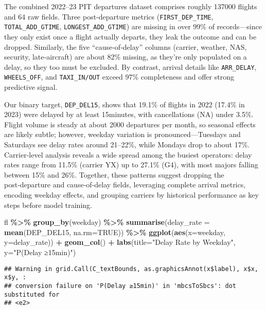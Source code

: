 \documentclass[
]{article}
\newenvironment{Shaded}{\begin{snugshade}}{\end{snugshade}}
\newcommand{\AttributeTok}[1]{\textcolor[rgb]{0.13,0.29,0.53}{#1}}
\newcommand{\ConstantTok}[1]{\textcolor[rgb]{0.56,0.35,0.01}{#1}}
\newcommand{\FunctionTok}[1]{\textcolor[rgb]{0.13,0.29,0.53}{\textbf{#1}}}
\newcommand{\NormalTok}[1]{#1}
\newcommand{\SpecialCharTok}[1]{\textcolor[rgb]{0.81,0.36,0.00}{\textbf{#1}}}
\newcommand{\StringTok}[1]{\textcolor[rgb]{0.31,0.60,0.02}{#1}}
\begin{document}
The combined 2022--23 PIT departures dataset comprises roughly 137000
flights and 64 raw fields. Three post‑departure metrics
(\texttt{FIRST\_DEP\_TIME}, \texttt{TOTAL\_ADD\_GTIME},
\texttt{LONGEST\_ADD\_GTIME}) are missing in over 99\% of
records---since they only exist once a flight actually departs, they
leak the outcome and can be dropped. Similarly, the five
``cause‑of‑delay'' columns (carrier, weather, NAS, security,
late‑aircraft) are about 82\% missing, as they're only populated on a
delay, so they too must be excluded. By contrast, arrival details like
\texttt{ARR\_DELAY}, \texttt{WHEELS\_OFF}, and \texttt{TAXI\_IN/OUT}
exceed 97\% completeness and offer strong predictive signal.

Our binary target, \texttt{DEP\_DEL15}, shows that 19.1\% of flights in
2022 (17.4\% in 2023) were delayed by at least 15minutes, with
cancellations (NA) under 3.5\%. Flight volume is steady at about 2000
departures per month, so seasonal effects are likely subtle; however,
weekday variation is pronounced---Tuesdays and Saturdays see delay rates
around 21--22\%, while Mondays drop to about 17\%. Carrier‑level
analysis reveals a wide spread among the busiest operators: delay rates
range from 11.5\% (carrier YX) up to 27.1\% (G4), with most majors
falling between 15\% and 26\%. Together, these patterns suggest dropping
the post‑departure and cause‑of‑delay fields, leveraging complete
arrival metrics, encoding weekday effects, and grouping carriers by
historical performance as key steps before model training.

\begin{Shaded}
\begin{Highlighting}[]
\NormalTok{fl }\SpecialCharTok{\%\textgreater{}\%}
  \FunctionTok{group\_by}\NormalTok{(weekday) }\SpecialCharTok{\%\textgreater{}\%}
  \FunctionTok{summarise}\NormalTok{(}\AttributeTok{delay\_rate =} \FunctionTok{mean}\NormalTok{(DEP\_DEL15, }\AttributeTok{na.rm=}\ConstantTok{TRUE}\NormalTok{)) }\SpecialCharTok{\%\textgreater{}\%}
  \FunctionTok{ggplot}\NormalTok{(}\FunctionTok{aes}\NormalTok{(}\AttributeTok{x=}\NormalTok{weekday, }\AttributeTok{y=}\NormalTok{delay\_rate)) }\SpecialCharTok{+}
    \FunctionTok{geom\_col}\NormalTok{() }\SpecialCharTok{+}
    \FunctionTok{labs}\NormalTok{(}\AttributeTok{title=}\StringTok{"Delay Rate by Weekday"}\NormalTok{, }\AttributeTok{y=}\StringTok{"P(Delay ≥15min)"}\NormalTok{)}
\end{Highlighting}
\end{Shaded}

\begin{verbatim}
## Warning in grid.Call(C_textBounds, as.graphicsAnnot(x$label), x$x, x$y, :
## conversion failure on 'P(Delay ≥15min)' in 'mbcsToSbcs': dot substituted for
## <e2>
\end{verbatim}
\end{document}
